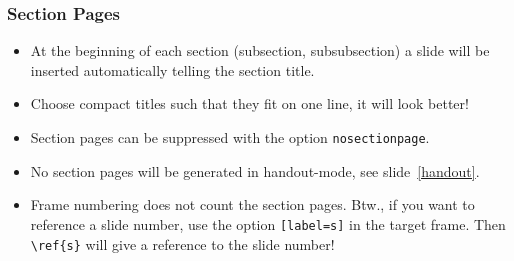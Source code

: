 \documentclass[aspectratio=169]{beamer}
\begin{document}
\begin{frame}[fragile]
 \frametitle{Section Pages}

 \begin{itemize}
  \item At the beginning of each section (subsection, subsubsection) a slide will be inserted automatically telling the section title.
  \item Choose compact titles such that they fit on one line, it will look better!
  \item Section pages can be suppressed with the option \texttt{nosectionpage}.
  \item No section pages will be generated in handout-mode, see slide~\ref{handout}.
  \item Frame numbering does not count the section pages. Btw., if you want to reference a slide number, use the option \verb+[label=s]+ in the target frame. Then \verb+\ref{s}+ will give a reference to the slide number!
 \end{itemize}
 
\end{frame}
\end{document}
